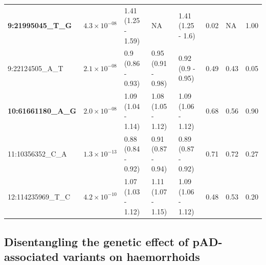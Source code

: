 \begin{table}[H]
\begin{adjustwidth}{-.1in}{-.5in}
\begin{tabular}[t]{p{}llllp{}p{}p{}}
      \textbf{9:21995045\_T\_G} & $4.3\times10^{-08}$ & 1.41 (1.25 - 1.59) & NA & 1.41 (1.25 - 1.6) & 0.02 & NA & 1.00\\
      9:22124505\_A\_T & $2.1\times10^{-08}$ & 0.9 (0.86 - 0.93) & 0.95 (0.91 - 0.98) & 0.92 (0.9 - 0.95) & 0.49 & 0.43 & 0.05\\
      \textbf{10:61661180\_A\_G} & $2.0\times10^{-08}$ & 1.09 (1.04 - 1.14) & 1.08 (1.05 - 1.12) & 1.09 (1.06 - 1.12) & 0.68 & 0.56 & 0.90\\
      11:10356352\_C\_A & $1.3\times10^{-13}$ & 0.88 (0.84 - 0.92) & 0.91 (0.87 - 0.94) & 0.89 (0.87 - 0.92) & 0.71 & 0.72 & 0.27\\
      12:114235969\_T\_C & $4.2\times10^{-10}$ & 1.07 (1.03 - 1.12) & 1.11 (1.07 - 1.15) & 1.09 (1.06 - 1.12) & 0.48 & 0.53 & 0.20\\
      \bottomrule
      \end{tabular}
    \end{adjustwidth}

      \end{table}   

      
      
    
 

  \subsection{Disentangling the genetic effect of pAD-associated variants on haemorrhoids}

